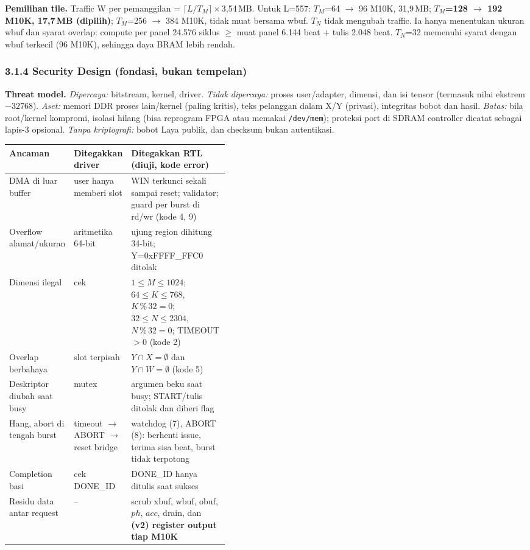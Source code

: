 \documentclass[10pt]{article}
\newcommand{\hd}[1]{\cellcolor{thg}\textbf{#1}}
\newcommand{\code}[1]{\texttt{\small #1}}
\begin{document}
\textbf{Pemilihan tile.} Traffic W per pemanggilan = $\lceil L/T_M\rceil\times$3,54\,MB. Untuk L=557: $T_M$=64 $\rightarrow$ 96 M10K, 31,9\,MB; \textbf{$T_M$=128 $\rightarrow$ 192 M10K, 17,7\,MB (dipilih)}; $T_M$=256 $\rightarrow$ 384 M10K, tidak muat bersama wbuf. $T_N$ tidak mengubah traffic. Ia hanya menentukan ukuran wbuf dan syarat overlap: compute per panel 24.576 siklus $\ge$ muat panel 6.144 beat + tulis 2.048 beat. $T_N$=32 memenuhi syarat dengan wbuf terkecil (96 M10K), sehingga daya BRAM lebih rendah.

\subsubsection{3.1.4 Security Design (fondasi, bukan tempelan)}
\textbf{Threat model.} \emph{Dipercaya:} bitstream, kernel, driver. \emph{Tidak dipercaya:} proses user/adapter, dimensi, dan isi tensor (termasuk nilai ekstrem $-32768$). \emph{Aset:} memori DDR proses lain/kernel (paling kritis), teks pelanggan dalam X/Y (privasi), integritas bobot dan hasil. \emph{Batas:} bila root/kernel kompromi, isolasi hilang (bisa reprogram FPGA atau memakai \code{/dev/mem}); proteksi port di SDRAM controller dicatat sebagai lapis-3 opsional. \emph{Tanpa kriptografi:} bobot Laya publik, dan checksum bukan autentikasi.

{\small
\begin{tabularx}{\linewidth}{|p{0.22\linewidth}|p{0.2\linewidth}|L|}
\hline
\hd{Ancaman} & \hd{Ditegakkan driver} & \hd{Ditegakkan RTL (diuji, kode error)} \\ \hline
DMA di luar buffer & user hanya memberi slot & WIN terkunci sekali sampai reset; validator; guard per burst di rd/wr (kode 4, 9) \\ \hline
Overflow alamat/ukuran & aritmetika 64-bit & ujung region dihitung 34-bit; Y=0xFFFF\_FFC0 ditolak \\ \hline
Dimensi ilegal & cek & $1\le M\le 1024$; $64\le K\le 768$, $K\,\%\,32=0$; $32\le N\le 2304$, $N\,\%\,32=0$; TIMEOUT$>0$ (kode 2) \\ \hline
Overlap berbahaya & slot terpisah & $Y\cap X = \emptyset$ dan $Y\cap W = \emptyset$ (kode 5) \\ \hline
Deskriptor diubah saat busy & mutex & argumen beku saat busy; START/tulis ditolak dan diberi flag \\ \hline
Hang, abort di tengah burst & timeout $\rightarrow$ ABORT $\rightarrow$ reset bridge & watchdog (7), ABORT (8): berhenti issue, terima sisa beat, burst tidak terpotong \\ \hline
Completion basi & cek DONE\_ID & DONE\_ID hanya ditulis saat sukses \\ \hline
Residu data antar request & -- & scrub xbuf, wbuf, obuf, $ph$, $acc$, drain, dan \textbf{(v2) register output tiap M10K} \\ \hline
\end{tabularx}}
\end{document}
